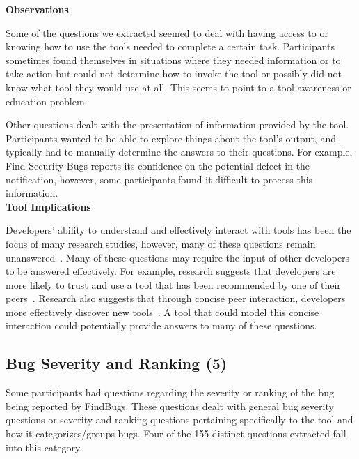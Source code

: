 \documentclass[conference]{IEEEtran}
\begin{document}
\noindent\textbf{Observations}

Some of the questions we extracted seemed to deal with having access to or knowing how to use the tools needed to complete a certain task. 
Participants sometimes found themselves in situations where they needed information or to take action but could not determine how to invoke the tool or possibly did not know what tool they would use at all. 
This seems to point to a tool awareness or education problem.

Other questions dealt with the presentation of information provided by the tool. 
Participants wanted to be able to explore things about the tool's output, and typically had to manually determine the answers to their questions. 
For example, Find Security Bugs reports its confidence on the potential defect in the notification, however, some participants found it difficult to process this information.
\\


\noindent\textbf{Tool Implications}

Developers' ability to understand and effectively interact with tools has been the focus of many research studies, however, many of these questions remain unanswered~\cite{ko2004designing, khoo2008path, johnson2013don}. 
Many of these questions may require the input of other developers to be answered effectively. 
For example, research suggests that developers are more likely to trust and use a tool that has been recommended by one of their peers~\cite{murphy2010trust}.
Research also suggests that through concise peer interaction, developers more effectively discover new tools~\cite{murphy2011peer}. 
A tool that could model this concise interaction could potentially provide answers to many of these questions.





\noindent\subsection{\textbf{Bug Severity and Ranking (5)}}\label{bsr}

Some participants had questions regarding the severity or ranking of the bug being reported by FindBugs. 
These questions dealt with general bug severity questions or severity and ranking questions pertaining specifically to the tool and how it categorizes/groups bugs. 
Four of the 155 distinct questions extracted fall into this category. 
\\
\end{document}
